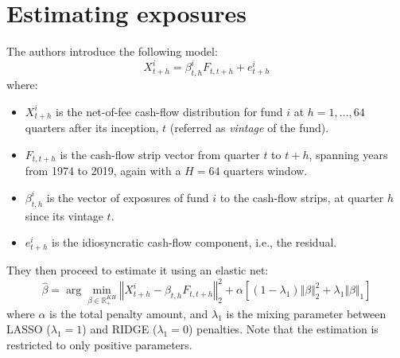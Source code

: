 \documentclass[12pt]{article}
\begin{document}
\section{Estimating exposures}\label{sec:estimating-exposures}
    The authors introduce the following model:
    \begin{equation}
        X_{t+h}^i = \beta^i_{t,h} F_{t,t+h} +e^i_{t+h}
        \label{eq:exposures}
    \end{equation}
    where:
    \begin{itemize}
        \item $X_{t+h}^i$ is the net-of-fee cash-flow distribution for fund $i$ at $h=1,\hdots, 64$ quarters after its inception, $t$ (referred as \textit{vintage} of the fund).
        \item $F_{t,t+h}$ is the cash-flow strip vector from quarter $t$ to $t+h$, spanning years from 1974 to 2019, again with a $H=64$ quarters window.
        \item $\beta^i_{t,h}$ is the vector of exposures of fund $i$ to the cash-flow strips, at quarter $h$ since its vintage $t$.
        \item $e^i_{t+h}$ is the idiosyncratic cash-flow component, i.e., the residual.
    \end{itemize}
    They then proceed to estimate it using an elastic net:
    \begin{equation}
        \hat \beta = \arg \min _{\beta \in \mathbb R^{KH}_+} \left \Vert X_{t+h}^i - \beta_{t,h} F_{t,t+h} \right \Vert_2^2 + \alpha \left[(1-\lambda_1)\Vert \beta \Vert_2^2 + \lambda_1 \Vert \beta \Vert_1\right]
        \label{eq:elastic-net}
    \end{equation}
    where $\alpha$ is the total penalty amount, and $\lambda_1$ is the mixing parameter between LASSO ($\lambda_1 =1$) and RIDGE ($\lambda_1 =0$) penalties.
    Note that the estimation is restricted to only positive parameters.
\end{document}
